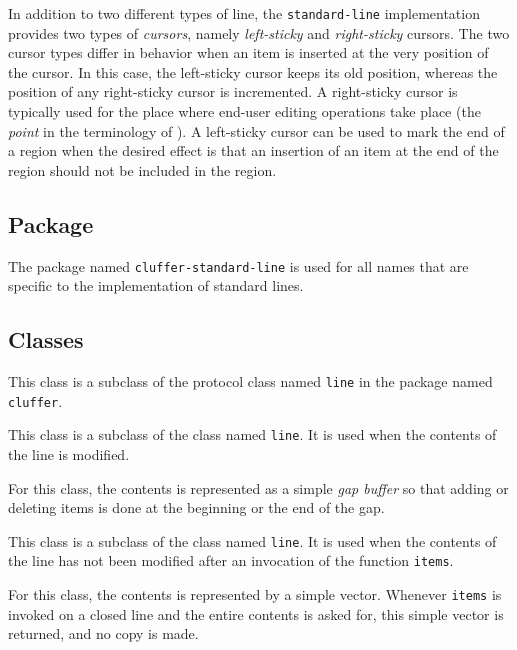 In addition to two different types of line, the \texttt{standard-line}
implementation provides two types of \emph{cursors}, namely
\emph{left-sticky} and \emph{right-sticky} cursors.  The two cursor
types differ in behavior when an item is inserted at the very position
of the cursor.  In this case, the left-sticky cursor keeps its old
position, whereas the position of any right-sticky cursor is
incremented.  A right-sticky cursor is typically used for the place
where end-user editing operations take place (the \emph{point} in the
terminology of \emacs{}).  A left-sticky cursor can be used to mark
the end of a region when the desired effect is that an insertion of an
item at the end of the region should not be included in the region.

\subsection{Package}

The package named \texttt{cluffer-standard-line} is used for all names
that are specific to the implementation of standard lines.

\subsection{Classes}


This class is a subclass of the protocol class named \texttt{line} in
the package named \texttt{cluffer}.


This class is a subclass of the class named \texttt{line}.  It is used
when the contents of the line is modified.

For this class, the contents is represented as a simple \emph{gap
  buffer} so that adding or deleting items is done at the beginning or
the end of the gap.


This class is a subclass of the class named \texttt{line}.  It is used
when the contents of the line has not been modified after an
invocation of the function \texttt{items}.

For this class, the contents is represented by a simple \commonlisp{}
vector.  Whenever \texttt{items} is invoked on a closed line and the
entire contents is asked for, this simple vector is returned, and no
copy is made.


